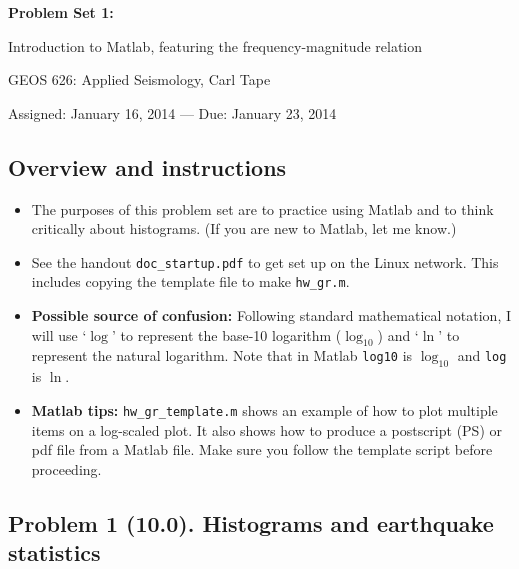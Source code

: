 \documentclass[11pt,titlepage,fleqn]{article}
\begin{document}

\begin{center}

{\large \bf Problem Set 1: 

Introduction to Matlab, featuring the frequency-magnitude relation}

GEOS 626: Applied Seismology, Carl Tape

Assigned: January 16, 2014 --- Due: January 23, 2014

\end{center}


\subsection*{Overview and instructions}

\begin{itemize}

\item The purposes of this problem set are to practice using Matlab and to think critically about histograms. (If you are new to Matlab, let me know.)

\item See the handout \verb+doc_startup.pdf+ to get set up on the Linux network. This includes copying the template file to make \verb+hw_gr.m+.

\item {\bf Possible source of confusion:} Following standard mathematical notation, I will use `$\log$' to represent the base-10 logarithm ($\log_{10}$) and `$\ln$' to represent the natural logarithm. Note that in Matlab \verb+log10+ is $\log_{10}$ and \verb+log+ is $\ln$.

\item {\bf Matlab tips:}
\verb+hw_gr_template.m+ shows an example of how to plot multiple items on a log-scaled plot. It also shows how to produce a postscript (PS) or pdf file from a Matlab file. Make sure you follow the template script before proceeding.

\end{itemize}


\subsection*{Problem 1 (10.0). Histograms and earthquake statistics}
\end{document}
